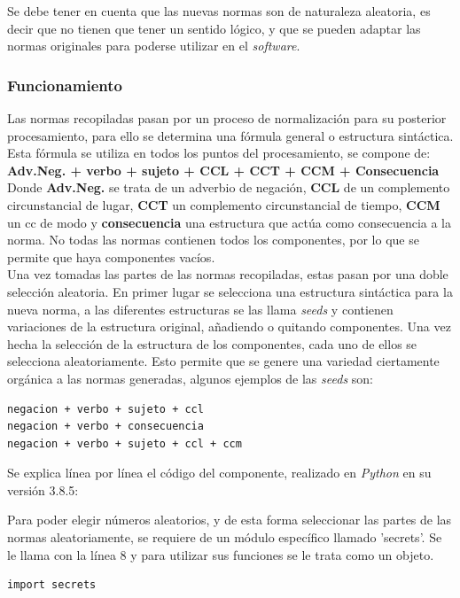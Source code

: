 \documentclass[12pt,twocolumn]{article}
\begin{document}
	Se debe tener en cuenta que las nuevas normas	 son de naturaleza aleatoria, es decir que no tienen que tener un sentido lógico, y que se pueden adaptar las normas originales para poderse utilizar en el \textit{software}.
	
	\subsubsection{Funcionamiento}

	Las normas recopiladas pasan por un proceso de normalización para su posterior procesamiento, para ello se determina una fórmula general o estructura sintáctica. Esta fórmula se utiliza en todos los puntos del procesamiento, se compone de:\\
	
	\textbf{Adv.Neg. + verbo + sujeto + CCL + CCT + CCM + Consecuencia}\\
	
	Donde \textbf{Adv.Neg.} se trata de un adverbio de negación, \textbf{CCL} de un complemento circunstancial de lugar, \textbf{CCT} un complemento circunstancial de tiempo, \textbf{CCM} un cc de modo y \textbf{consecuencia} una estructura que actúa como consecuencia a la norma. No todas las normas contienen todos los componentes, por lo que se permite que haya componentes vacíos.\\
	
	Una vez tomadas las partes de las normas recopiladas, estas pasan por una doble selección aleatoria. En primer lugar se selecciona una estructura sintáctica para la nueva norma, a las diferentes estructuras se las llama \textit{seeds} y contienen variaciones de la estructura original, añadiendo o quitando componentes.
	Una vez hecha la selección de la estructura de los componentes, cada uno de ellos se selecciona aleatoriamente. Esto permite que se genere una variedad ciertamente orgánica a las normas generadas, algunos ejemplos de las \textit{seeds} son:
	\begin{lstlisting}[texcl=true]
negacion + verbo + sujeto + ccl 
negacion + verbo + consecuencia
negacion + verbo + sujeto + ccl + ccm
	\end{lstlisting}
	
	Se explica línea por línea el código del componente, realizado en \textit{Python} en su versión 3.8.5:

	

Para poder elegir números aleatorios, y de esta forma seleccionar las partes de
las normas aleatoriamente, se requiere de un módulo específico llamado 'secrets'.
Se le llama con la línea 8 y para utilizar sus funciones se le trata como
un objeto.
\begin{lstlisting}[texcl=true]
import secrets
\end{lstlisting}
\end{document}
